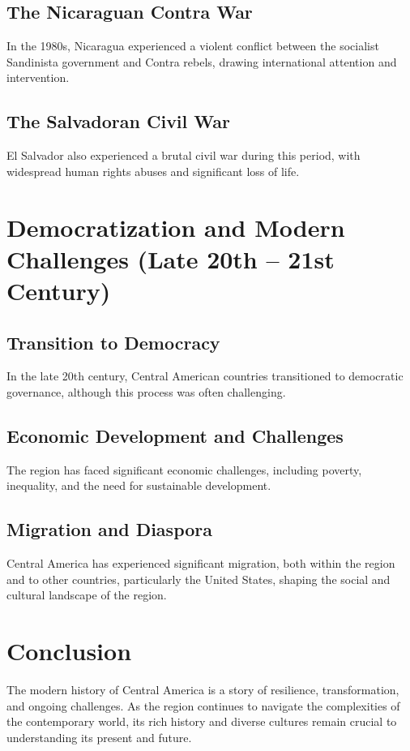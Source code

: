 \documentclass{book}
\begin{document}
\subsection{The Nicaraguan Contra War}
\label{subsec:nicaraguan-contra-war}
In the 1980s, Nicaragua experienced a violent conflict between the socialist Sandinista government and Contra rebels, drawing international attention and intervention.

\subsection{The Salvadoran Civil War}
\label{subsec:salvadoran-civil-war}
El Salvador also experienced a brutal civil war during this period, with widespread human rights abuses and significant loss of life.

\section{Democratization and Modern Challenges (Late 20th – 21st Century)}
\label{sec:democratization-modern-challenges}
\subsection{Transition to Democracy}
\label{subsec:transition-democracy}
In the late 20th century, Central American countries transitioned to democratic governance, although this process was often challenging.

\subsection{Economic Development and Challenges}
\label{subsec:economic-development-challenges}
The region has faced significant economic challenges, including poverty, inequality, and the need for sustainable development.

\subsection{Migration and Diaspora}
\label{subsec:migration-diaspora}
Central America has experienced significant migration, both within the region and to other countries, particularly the United States, shaping the social and cultural landscape of the region.

\section{Conclusion}
\label{sec:conclusion-modern-central-america}
The modern history of Central America is a story of resilience, transformation, and ongoing challenges. As the region continues to navigate the complexities of the contemporary world, its rich history and diverse cultures remain crucial to understanding its present and future.
\end{document}
